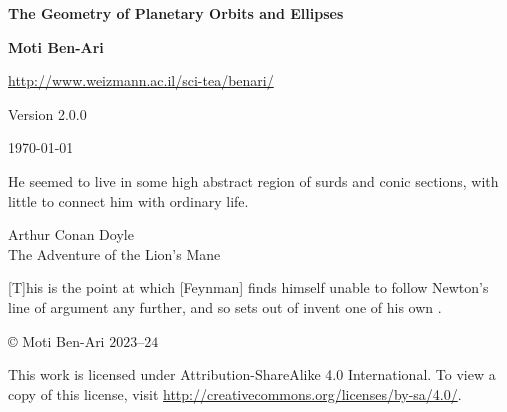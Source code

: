 


\thispagestyle{empty}

\begin{center}
\textbf{\LARGE The Geometry of Planetary Orbits and Ellipses}

\bigskip
\bigskip
\bigskip

\textbf{\Large Moti Ben-Ari}

\bigskip

\url{http://www.weizmann.ac.il/sci-tea/benari/}

\bigskip

Version 2.0.0

\bigskip

\today

\end{center}

\vspace*{8ex}

\hfill\begin{minipage}{.5\textwidth}
\small He seemed to live in some high abstract region of surds and conic sections, with little to connect him with ordinary life.
\begin{flushright}
Arthur Conan Doyle\\The Adventure of the Lion’s Mane
\end{flushright}
\end{minipage}

\vspace*{8ex}

\hfill\begin{minipage}{.5\textwidth}
[T]his is the point at which [Feynman] finds himself unable to follow Newton's line of argument any further, and so sets out of invent one of his own \cite[p.~111]{lost}.
\end{minipage}

\vfill

\begin{center}
\copyright{} Moti Ben-Ari $2023$--$24$
\end{center}
 
\begin{small}
This work is licensed under Attribution-ShareAlike 4.0 International. To view a copy of this license, visit \url{http://creativecommons.org/licenses/by-sa/4.0/}.
\end{small}

